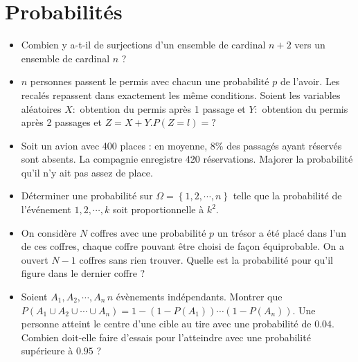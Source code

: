 \documentclass[a4paper, 11pt, french]{article}
\newcommand{\Om}{\Omega}
\newcommand{\acc}[1]{\left\{ #1 \right\}}
\begin{document}
	\section*{Probabilités}
	\begin{itemize}
		\item Combien y a-t-il de surjections d'un ensemble de cardinal $n+2$ vers un ensemble de cardinal $n$ ?
		\item $n$ personnes passent le permis avec chacun une probabilité $p$ de l'avoir. Les recalés repassent dans exactement les même conditions. Soient les variables aléatoires $X :$ obtention du permis après 1 passage et $Y :$ obtention du permis après 2 passages et $Z=X+Y. P(Z=l) =?$
		\item Soit un avion avec 400 places : en moyenne, 8\% des passagés ayant réservés sont absents. La compagnie enregistre 420 réservations. Majorer la probabilité qu'il n'y ait pas assez de place.
		\item Déterminer une probabilité sur $\Om =\acc{1,2,\cdots,n}$ telle que la probabilité de l'événement ${1,2,\cdots,k}$ soit proportionnelle à $k^2$.
		\item On considère $N$ coffres avec une probabilité $p$ un trésor a été placé dans l'un de ces coffres, chaque coffre pouvant être choisi de façon équiprobable. On a ouvert $N-1$ coffres sans rien trouver. Quelle est la probabilité pour qu'il figure dans le dernier coffre ?
		\item Soient $A_1,A_2,\cdots,A_n \, n$ évènements indépendants. Montrer que \\ ${P(A_1\cup A_2 \cup \cdots \cup A_n)=1-(1-P(A_1))\cdots(1-P(A_n))}.$ Une personne atteint le centre d'une cible au tire avec une probabilité de $0.04.$ Combien doit-elle faire d'essais pour l'atteindre avec une probabilité supérieure à $0.95$ ?
	\end{itemize}
\end{document}
